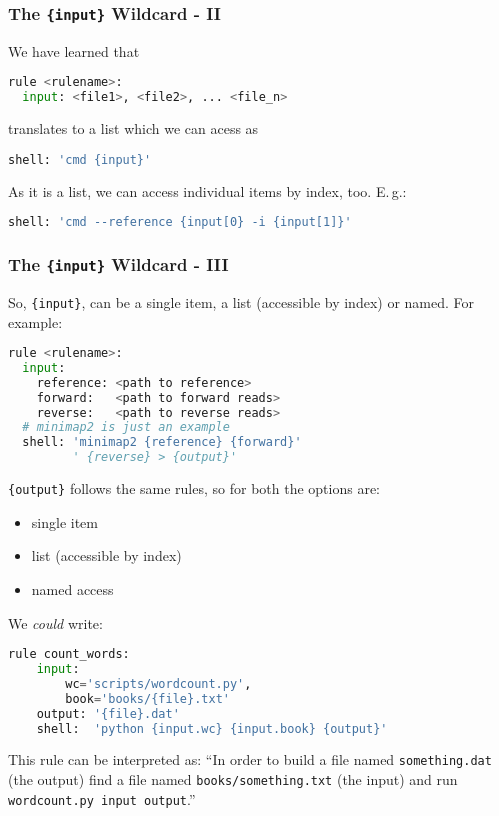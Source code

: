 \begin{frame}[fragile]
  \frametitle{The \texttt{\{input\}} Wildcard - II}
  We have learned that
  \begin{lstlisting}[language=Python,style=Python]
rule <rulename>:
  input: <file1>, <file2>, ... <file_n>
  \end{lstlisting}
  translates to a list which we can acess as
  \begin{lstlisting}[language=Python,style=Python]
  shell: 'cmd {input}'
  \end{lstlisting}
  As it is a list, we can access individual items by index, too. E.\,g.:
  \begin{lstlisting}[language=Python,style=Python]
  shell: 'cmd --reference {input[0} -i {input[1]}'
  \end{lstlisting}
\end{frame}

\begin{frame}[fragile]
  \frametitle{The \texttt{\{input\}} Wildcard - III}
  So, \texttt{\{input\}}, can be a single item, a list (accessible by index) or named. For example:
  \begin{lstlisting}[language=Python,style=Python]
rule <rulename>:
  input:
    reference: <path to reference>
    forward:   <path to forward reads>
    reverse:   <path to reverse reads>
  # minimap2 is just an example
  shell: 'minimap2 {reference} {forward}' 
         ' {reverse} > {output}'
  \end{lstlisting}
  \pause
  \texttt{\{output\}} follows the same rules, so for both the options are:
  \begin{itemize}
   \item single item
   \item list (accessible by index)
   \item named access
  \end{itemize}
\end{frame}

\begin{frame}[fragile]
  We \emph{could} write:
  \begin{lstlisting}[language=Python,style=Python]
rule count_words:
    input:
        wc='scripts/wordcount.py',
        book='books/{file}.txt'
    output: '{file}.dat'
    shell:  'python {input.wc} {input.book} {output}'
  \end{lstlisting}
  \begin{block}{This rule can be interpreted as:}
``In order to build a file named \texttt{something.dat} (the output) find a file named \texttt{books/something.txt} (the input) and run \texttt{wordcount.py input output}.''
  \end{block}
\end{frame}
